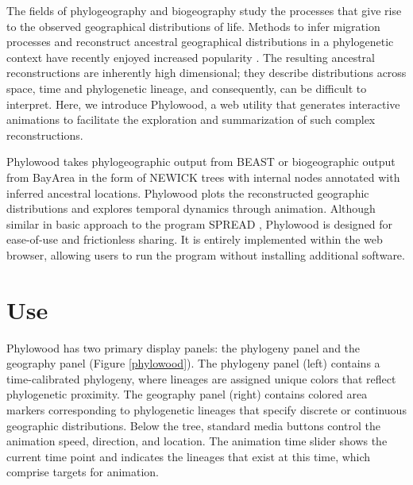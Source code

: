 \documentclass{bioinfo}
\begin{document}
The fields of phylogeography and biogeography study the processes that give rise to the observed geographical distributions of life. Methods to infer migration processes and reconstruct ancestral geographical distributions in a phylogenetic context have recently enjoyed increased popularity \citep{ree08, lemey09, yu10, landis13}. The resulting ancestral reconstructions are inherently high dimensional; they describe distributions across space, time and phylogenetic lineage, and consequently, can be difficult to interpret. Here, we introduce Phylowood, a web utility that generates interactive animations to facilitate the exploration and summarization of such complex reconstructions.

Phylowood takes phylogeographic output from BEAST \citep{drummond12} or biogeographic output from BayArea \citep{landis13} in the form of NEWICK trees with internal nodes annotated with inferred ancestral locations.
Phylowood plots the reconstructed geographic distributions and explores temporal dynamics through animation.
Although similar in basic approach to the program SPREAD \citep{bielejec11}, Phylowood is designed for ease-of-use and frictionless sharing.
It is entirely implemented within the web browser, allowing users to run the program without installing additional software.


\section{Use}

Phylowood has two primary display panels: the phylogeny panel and the geography panel (Figure \ref{phylowood}). The phylogeny panel (left) contains a time-calibrated phylogeny, where lineages are assigned unique colors that reflect phylogenetic proximity. The geography panel (right) contains colored area markers corresponding to phylogenetic lineages that specify discrete or continuous geographic distributions. Below the tree, standard media buttons control the animation speed, direction, and location. The animation time slider shows the current time point and indicates the lineages that exist at this time, which comprise targets for animation.

\end{document}
